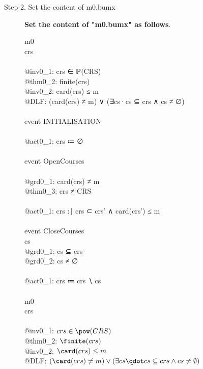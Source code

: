 \begin{description}
\item[Step 2. Set the content of m0.bumx] \textbf{Set the content of "m0.bumx" as follows}.
  \begin{center}
    \begin{Bcode}
      \Bmachine{} m0 \\
      \Bvariables{} crs \\
      \Binvariants \\
      @inv0_1: crs ∈ ℙ(CRS)\\
      \Btheorem{} @thm0_2: finite(crs) \\
      @inv0_2: card(crs) ≤ m \\
      @DLF: (card(crs) ≠ m) ∨ (∃cs·cs ⊆ crs ∧ cs ≠ ∅) \\
      \Bevents\\
      event INITIALISATION\\
      \Bthen \\
      @act0_1: crs ≔ ∅\\
      \Bend\\
      event OpenCourses\\
      \Bwhere\\
      @grd0_1: card(crs) ≠ m\\
      \Btheorem{} @thm0_3: crs ≠ CRS\\
      \Bthen\\
      @act0_1: crs :∣ crs ⊂ crs' ∧ card(crs') ≤ m\\
      \Bend\\
      \Banticipated{} event CloseCourses \\
      \Bany{} cs \Bwhere\\
      @grd0_1: cs ⊆ crs\\
      @grd0_2: cs ≠ ∅\\
      \Bthen\\
      @act0_1: crs ≔ crs ∖ cs\\
      \Bend\\
      \Bend
      \else
      \Bmachine{} m0 \\
      \Bvariables{} crs \\
      \Binvariants \\
      \Btab @inv0\_1: \(crs \in \pow(CRS)\)\\
      \Btab \Btheorem{} @thm0\_2: \(\finite(crs)\) \\
      \Btab @inv0\_2: \(\card(crs) \leq m\) \\
      \Btab @DLF: \((\card(crs) \neq m) \lor (\exists cs \qdot cs \subseteq crs \land cs \neq \emptyset)\) \\

\end{Bcode}
\end{center}
\end{description}
